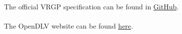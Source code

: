 The official VRGP specification can be found in \href{https://github.com/aboamare/vrgp-specifications/blob/master/Protocol\%20specification.md}{GitHub}.
\\\\
The OpenDLV website can be found \href{https://opendlv.org}{here}. 